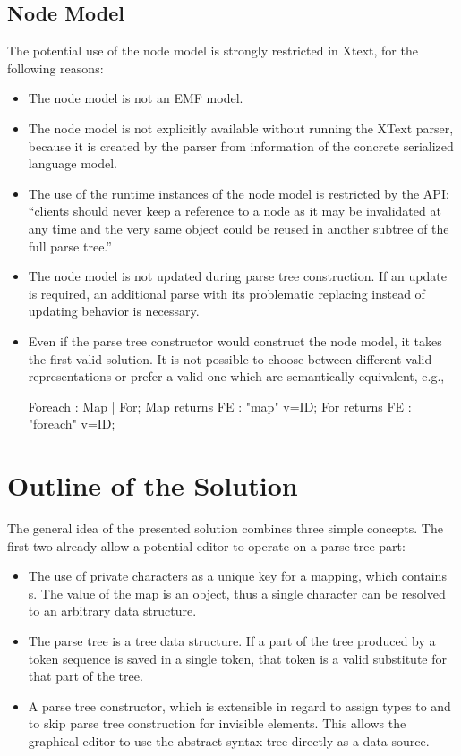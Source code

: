 \subsection{Node Model}
The potential use of the node model is strongly restricted in Xtext, for the following reasons:
\begin{itemize}
	\item The node model is not an EMF model. 
	\item The node model is not explicitly available without running the XText parser, because it is created by the parser from information of the concrete serialized language model. 
	\item The use of the runtime instances of the node model is restricted by the API: ``clients should never keep a reference to a node as it may be invalidated at any time and the very same object could be reused in another subtree of the full parse tree.''\cite{XTextAPI}
	\item The node model is not updated during parse tree construction. If an update is required, an additional parse with its problematic replacing instead of updating behavior is necessary.
	\item Even if the parse tree constructor would construct the node model, it takes the first valid solution. It is not possible to choose between different valid representations or prefer a valid one which are semantically equivalent, e.g.,
\begin{xtxt}
Foreach 		: 	Map | For;
Map returns FE  	:  	"map" 		v=ID;
For returns FE  	: 	"foreach"	v=ID;
\end{xtxt}
\end{itemize}


\section{Outline of the Solution}
The general idea of the presented solution combines three simple concepts. The first two already allow a potential editor to operate on a parse tree part:
\begin{itemize}
	\item The use of private characters as a unique key for a mapping, which contains s. The value of the map is an object, thus a single character can be resolved to an arbitrary data structure.
	\item The parse tree is a tree data structure. If a part of the tree produced by a token sequence is saved in a single token, that token is a valid substitute for that part of the tree.
	\item A parse tree constructor, which is extensible in regard to assign types to and to skip parse tree construction for invisible elements. This allows the graphical editor to use the abstract syntax tree directly as a data source. 
\end{itemize}

